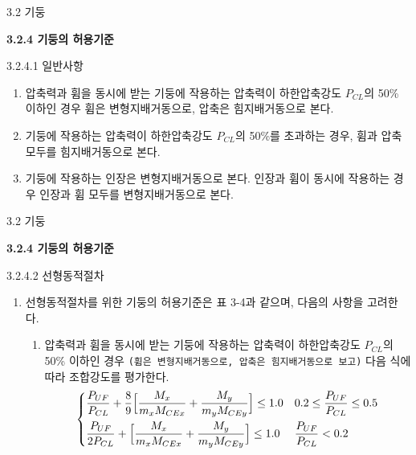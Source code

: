 	\begin{frame}{3.2 기둥}

	\textbf{3.2.4 기둥의 허용기준}

3.2.4.1 일반사항

\begin{enumerate}
	\item[(1)] 압축력과 휨을 동시에 받는 기둥에 작용하는 압축력이 하한압축강도 $P_{CL}$의 50\% 이하인 경우 휨은 변형지배거동으로, 압축은 힘지배거동으로 본다. 
	\item[(2)] 기둥에 작용하는 압축력이 하한압축강도 $P_{CL}$의 50\%를 초과하는 경우, 휨과 압축 모두를 힘지배거동으로 본다. 
	\item[(3)] 기둥에 작용하는 인장은 변형지배거동으로 본다. 인장과 휨이 동시에 작용하는 경우 인장과 휨 모두를 변형지배거동으로 본다. 
\end{enumerate}

	\end{frame}
	
	\begin{frame}{3.2 기둥}

	\textbf{3.2.4 기둥의 허용기준} 
		
3.2.4.2 선형동적절차

\begin{enumerate}
	\item[(1)] 선형동적절차를 위한 기둥의 허용기준은 표 3-4과 같으며, 다음의 사항을 고려한다. 
	\begin{enumerate}[label=\large\protect\textcircled{\small\arabic*}]
		\item 압축력과 휨을 동시에 받는 기둥에 작용하는 압축력이 하한압축강도 $P_{CL}$의 50\% 이하인 경우 \texttt{(휨은 변형지배거동으로, 압축은 힘지배거동으로 보고)} 다음 식에 따라 조합강도를 평가한다.
		\[\begin{dcases}\frac{P_{UF}}{P_{CL}} + \frac{8}{9}\Big[\frac{M_x}{m_x M_{CEx}} + \frac{M_y}{m_y M_{CEy}}\Big] \leq 1.0 & 0.2 \leq \frac{P_{UF}}{P_{CL}} \leq 0.5 \\ \frac{P_{UF}}{2P_{CL}} + \Big[\frac{M_x}{m_x M_{CEx}} + \frac{M_y}{m_y M_{CEy}}\Big] \leq 1.0 & \frac{P_{UF}}{P_{CL}} < 0.2 \end{dcases}\]
	\end{enumerate}	 
\end{enumerate}

	\end{frame}
	
